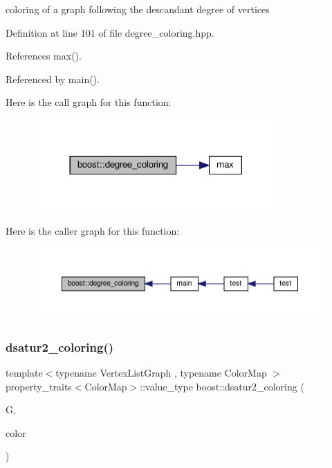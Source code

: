 coloring of a graph following the descandant degree of vertices 



Definition at line 101 of file degree\+\_\+coloring.\+hpp.



References max().



Referenced by main().

Here is the call graph for this function\+:
\nopagebreak
\begin{figure}[H]
\begin{center}
\leavevmode
\includegraphics[width=266pt]{d4/da9/namespaceboost_a78c0b54ba26e1079abb19d6cca78c8e8_cgraph}
\end{center}
\end{figure}
Here is the caller graph for this function\+:
\nopagebreak
\begin{figure}[H]
\begin{center}
\leavevmode
\includegraphics[width=350pt]{d4/da9/namespaceboost_a78c0b54ba26e1079abb19d6cca78c8e8_icgraph}
\end{center}
\end{figure}
\mbox{\label{namespaceboost_a609873070b85df59333adc0769a99f6e}} 
\subsubsection{\texorpdfstring{dsatur2\+\_\+coloring()}{dsatur2\_coloring()}}
{\footnotesize\ttfamily template$<$typename Vertex\+List\+Graph , typename Color\+Map $>$ \\
property\+\_\+traits$<$Color\+Map$>$\+::value\+\_\+type boost\+::dsatur2\+\_\+coloring (\begin{DoxyParamCaption}\item[{const Vertex\+List\+Graph \&}]{G,  }\item[{Color\+Map}]{color }\end{DoxyParamCaption})}



